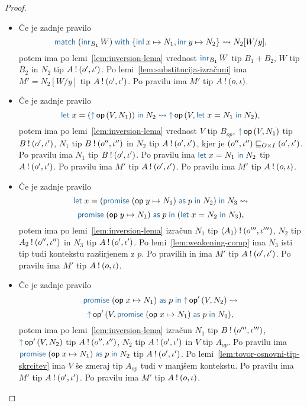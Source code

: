 \begin{proof}
\begin{itemize}
		\item Če je zadnje pravilo $$\tmmatch{(\tminr[B_1]{W})}{\tminl{x} \mapsto N_1, \tminr{y} \mapsto N_2} \reduces N_2[W/y],$$ potem ima po lemi~\ref{lem:inversion-lema} vrednost $\tminr[B_1]{W}$ tip $B_1 + B_2$, $W$ tip $B_2$ in $N_2$ tip $A \mathbin{!} (o', \iota')$.
		Po lemi~\ref{lem:substitucija-izračuni} ima $M' = N_2[W/y]$ tip $A \mathbin{!} (o', \iota')$.
		Po pravilu  ima $M'$ tip $A \mathbin{!} (o, \iota)$.
		
		\item Če je zadnje pravilo $$\tmlet{x}{(\tmopout{op}{V}{N_1})}{N_2} \reduces \tmopout{op}{V}{\tmlet{x}{N_1}{N_2}},$$ potem ima po lemi~\ref{lem:inversion-lema} vrednost $V$ tip $B_{op}$, $\tmopout{op}{V}{N_1}$ tip $B \mathbin{!} (o', \iota')$, $N_1$ tip $B \mathbin{!} (o'', \iota'')$ in $N_2$ tip $A \mathbin{!} (o', \iota')$, kjer je $(o'', \iota'') \sqsubseteq_{O \times I} (o', \iota')$.
		Po pravilu  ima $N_1$ tip $B \mathbin{!} (o', \iota')$.
		Po pravilu  ima $\tmlet{x}{N_1}{N_2}$ tip $A \mathbin{!} (o', \iota')$.
		Po pravilu  ima $M'$ tip $A \mathbin{!} (o', \iota')$.
		Po pravilu  ima $M'$ tip $A \mathbin{!} (o, \iota)$.
		
		\item Če je zadnje pravilo $$\tmlet{x}{(\tmwith{op}{y}{N_1}{p}{N_2})}{N_3} \reduces$$ $$ \tmwith{op}{y}{N_1}{p}{(\tmlet{x}{N_2}{N_3})},$$ potem ima po lemi~\ref{lem:inversion-lema} izračun $N_1$ tip $\langle A_1 \rangle \mathbin{!} (o''', \iota''')$, $N_2$ tip $A_2 \mathbin{!} (o'', \iota'')$ in $N_3$ tip $A \mathbin{!} (o', \iota')$.
		Po lemi~\ref{lem:weakening-comp} ima $N_3$ isti tip tudi kontekstu razširjenem z $p$.
		Po pravilih  in  ima $M'$ tip $A \mathbin{!} (o', \iota')$.
		Po pravilu  ima $M'$ tip $A \mathbin{!} (o, \iota)$.
		
		\item Če je zadnje pravilo $$\tmwith{op}{x}{N_1}{p}{\tmopout{op'}{V}{N_2}} \reduces$$ $$ \tmopout{op'}{V}{\tmwith{op}{x}{N_1}{p}{N_2}},$$ potem ima po lemi~\ref{lem:inversion-lema} izračun $N_1$ tip $B \mathbin{!} (o''', \iota''')$, $\tmopout{op'}{V}{N_2}$ tip $A \mathbin{!} (o'', \iota'')$, $N_2$ tip $A \mathbin{!} (o', \iota')$ in $V$ tip $A_{op}$.
		Po pravilu  ima $\tmwith{op}{x}{N_1}{p}{N_2}$ tip $A \mathbin{!} (o', \iota')$.
		Po lemi~\ref{lem:tovor-osnovni-tip-skrcitev} ima $V$ še zmeraj tip $A_{op}$ tudi v manjšem kontekstu. Po pravilu  ima $M'$ tip $A \mathbin{!} (o', \iota')$.
		Po pravilu  ima $M'$ tip $A \mathbin{!} (o, \iota)$.
		

\end{itemize}
\end{proof}
